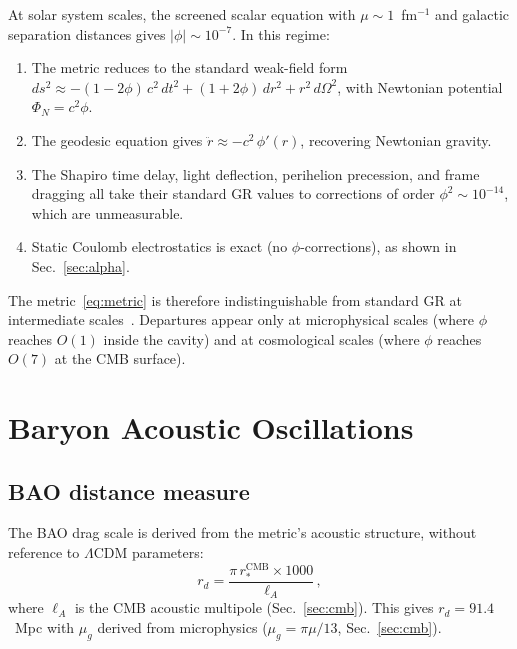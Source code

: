 \documentclass[aps,prd,twocolumn,superscriptaddress,nofootinbib,longbibliography]{revtex4-2}
\newcommand{\rstar}{r_{*}}
\newcommand{\mug}{\mu_g}
\begin{document}
At solar system scales, the screened scalar equation with
$\mu \sim 1$~fm$^{-1}$ and galactic separation distances gives
$|\phi| \sim 10^{-7}$.  In this regime:
\begin{enumerate}
\item The metric reduces to the standard weak-field form
  $ds^2 \approx -(1 - 2\phi)\,c^2\,dt^2 + (1 + 2\phi)\,dr^2
  + r^2\,d\Omega^2$,
  with Newtonian potential $\Phi_N = c^2\phi$.
\item The geodesic equation gives $\ddot{r} \approx -c^2\,\phi'(r)$,
  recovering Newtonian gravity.
\item The Shapiro time delay, light deflection, perihelion precession,
  and frame dragging all take their standard GR values to corrections
  of order $\phi^2 \sim 10^{-14}$, which are unmeasurable.
\item Static Coulomb electrostatics is exact (no $\phi$-corrections),
  as shown in Sec.~\ref{sec:alpha}.
\end{enumerate}
The metric~\eqref{eq:metric} is therefore indistinguishable from
standard GR at intermediate scales~\cite{Will2014}.  Departures
appear only at microphysical scales (where $\phi$ reaches $O(1)$
inside the cavity) and at cosmological scales (where $\phi$ reaches
$O(7)$ at the CMB surface).

\section{Baryon Acoustic Oscillations}\label{sec:bao}

\subsection{BAO distance measure}

The BAO drag scale is derived from the metric's acoustic structure,
without reference to $\Lambda$CDM parameters:
\begin{equation}\label{eq:rd}
  r_d = \frac{\pi\,\rstar^{\mathrm{CMB}} \times 1000}{\ell_A}\,,
\end{equation}
where $\ell_A$ is the CMB acoustic multipole (Sec.~\ref{sec:cmb}).
This gives $r_d = 91.4$~Mpc with $\mug$ derived from microphysics
($\mug = \pi\mu/13$, Sec.~\ref{sec:cmb}).
\end{document}
